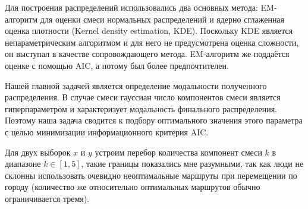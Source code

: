 \documentclass[12pt, fleqn, titlepage]{article}
\begin{document}
    Для построения распределений использовались два основных метода: EM-алгоритм для оценки смеси нормальных распределений и 
    ядерно сглаженная оценка плотности (Kernel density estimation, KDE). Поскольку KDE является непараметрическим алгоритмом 
    и для него не предусмотрена оценка сложности, он выступал в качестве сопровождающего метода. EM-алгоритм же поддаётся 
    оценке с помощью AIC, а потому был более предпочтителен.

    Нашей главной задачей является определение модальности полученного распределения. В случае смеси гауссиан число компонентов 
    смеси является гиперпараметром и характеризует модальность финального распределения. Поэтому наша задача сводится к подбору 
    оптимального значения этого параметра с целью минимизации информационного критерия AIC. 

    Для двух выборок $x$ и $y$ устроим перебор количества компонент смеси  $k$ в диапазоне $k \in [1, 5]$, такие границы 
    показались мне разумными, так как люди не склонны использовать очевидно неоптимальные маршруты при перемещении по городу 
    (количество же относительно оптимальных маршрутов обычно ограничивается тремя). 
\end{document}

